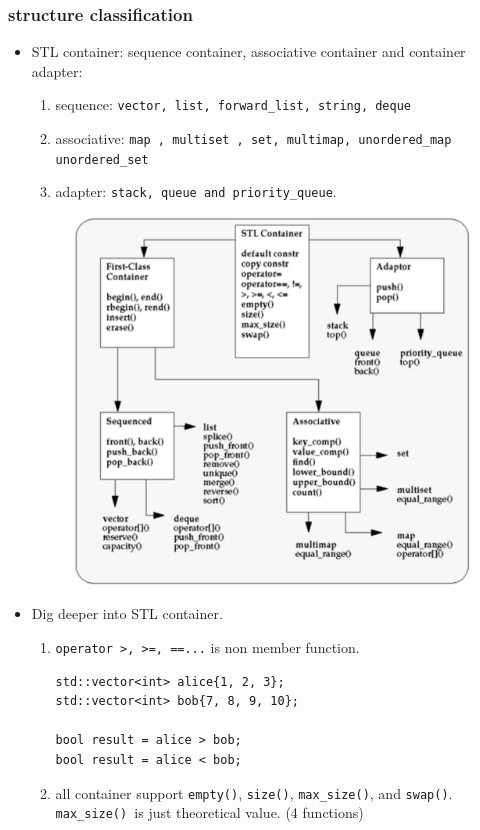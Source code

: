 \documentclass[a4paper,11pt,twoside]{book}
\begin{document}
\subsubsection{structure classification}
\begin{itemize}

\item STL container: sequence container, associative container and container adapter:
\begin{enumerate}
\item sequence: \texttt{vector, list, forward\_list, string,  deque}
\item associative: \texttt{map , multiset , set, multimap, unordered\_map unordered\_set}
\item adapter: \texttt{stack, queue and priority\_queue}.
\end{enumerate}

\begin{figure}[ht]
	\centering
	\includegraphics[width=0.7\linewidth]{pics/container.png}
	\label{fig:constexpr}
\end{figure}

\item Dig deeper into STL container.

\begin{enumerate}
	\item \texttt{operator >, >=, ==...} is non member function. 
\begin{lstlisting}
std::vector<int> alice{1, 2, 3};
std::vector<int> bob{7, 8, 9, 10};

bool result = alice > bob;
bool result = alice < bob;
\end{lstlisting}	

\item all container support \texttt{empty()}, \texttt{size()}, \texttt{max\_size()}, and \texttt{swap()}. \texttt{max\_size() }is just theoretical value. (4  functions)


\end{enumerate}
\end{itemize}
\end{document}

